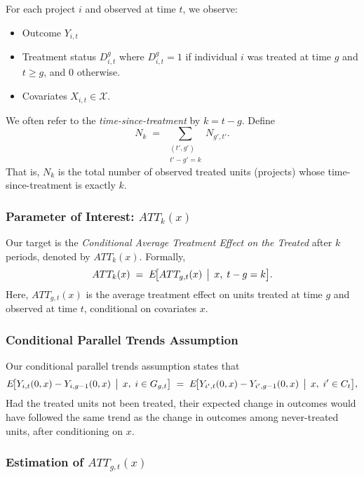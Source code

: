 \documentclass[source/paper/main.tex]{subfiles}
\begin{document}
For each project $i$ and observed at time $t$, we observe:
\begin{itemize}
    \item Outcome $Y_{i,t}$
    \item Treatment status $D_{i,t}^g$ where $D_{i,t}^g = 1$ if individual $i$ was treated at time $g$ and $t\geq g$, and 0 otherwise. 
    \item Covariates $X_{i,t} \in \mathcal{X}$.
\end{itemize}

We often refer to the \emph{time-since-treatment} by $k = t - g$. Define
\[
    N_k 
    \;=\; 
    \sum_{\substack{(t', g') \\ t' - g' = k}} 
    N_{g', t'}.
\]
That is, $N_k$ is the total number of observed treated units (projects) whose time-since-treatment is exactly $k$.

\subsubsection{Parameter of Interest: \texorpdfstring{$ATT_k(x)$}{ATT\_k(x)}}

Our target is the \emph{Conditional Average Treatment Effect on the Treated} after $k$ periods, denoted by $ATT_k(x)$. Formally,
\[
    ATT_{k}(x)
    \;=\; 
    E\!\bigl[
      ATT_{g,t}(x)
      \,\bigm|\,
      x,\; t - g = k
    \bigr].
\]
Here, $ATT_{g,t}(x)$ is the average treatment effect on units treated at time $g$ and observed at time $t$, conditional on covariates $x$.

\subsubsection{Conditional Parallel Trends Assumption}
Our conditional parallel trends assumption states that 
\[
    E\!\bigl[
      Y_{i,t}(0, x) - Y_{i,g-1}(0, x)
      \,\bigm|\,
      x,\; i \in G_{g,t}
    \bigr]
    \;=\;
    E\!\bigl[
      Y_{i',t}(0, x) - Y_{i',g-1}(0, x)
      \,\bigm|\,
      x,\; i' \in C_t
    \bigr],
\]
Had the treated units not been treated, their expected change in outcomes would have followed the same trend as the change in outcomes among never-treated units, after conditioning on $x$.

\subsubsection{Estimation of \texorpdfstring{$ATT_{g,t}(x)$}{ATT\_g,t(x)}}
\end{document}
